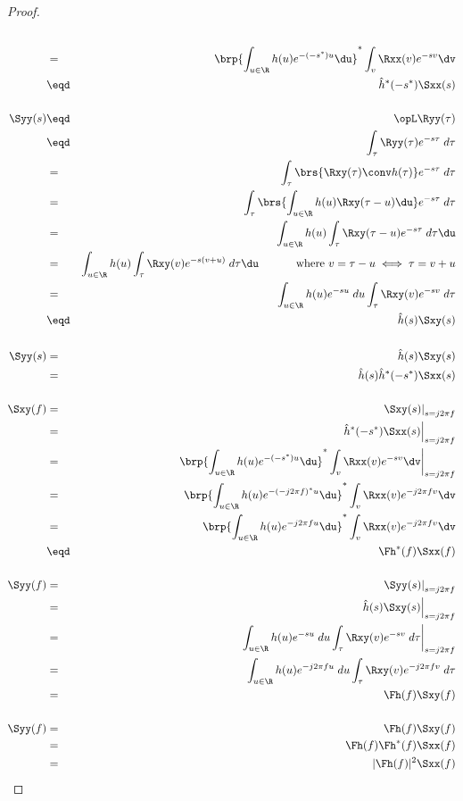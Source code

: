 \begin{proof}
\begin{eqnarray*}
   \\&=&    \brp{\int_{u\in\R}h(u) e^{-(-s^\ast)u} \du }^\ast
            \int_v \Rxx(v)e^{-sv} \dv
   \\&\eqd& \hat{h}^\ast(-s^\ast) \Sxx(s)
\\
\\
   \Syy(s)
     &\eqd& \opL \Ryy(\tau)
   \\&\eqd& \int_\tau \Ryy(\tau) e^{-s\tau} \; d\tau
   \\&=&    \int_\tau \brs{ \Rxy(\tau) \conv h(\tau) } e^{-s\tau} \; d\tau
   \\&=&    \int_\tau \brs{ \int_{u\in\R}h(u) \Rxy(\tau-u)\du } e^{-s\tau} \; d\tau
   \\&=&    \int_{u\in\R}h(u) \int_\tau \Rxy(\tau-u) e^{-s\tau} \; d\tau\du
   \\&=&    \int_{u\in\R}h(u) \int_\tau \Rxy(v) e^{-s(v+u)} \; d\tau\du
            \hspace{3em}\mbox{ where $v=\tau-u\iff \tau=v+u$}
   \\&=&    \int_{u\in\R}h(u)e^{-su} \;du \int_\tau \Rxy(v) e^{-sv} \; d\tau
   \\&\eqd& \hat{h}(s) \Sxy(s)
\\
\\
   \Syy(s)
     &=& \hat{h}(s) \Sxy(s)
   \\&=& \hat{h}(s) \hat{h}^\ast(-s^\ast) \Sxx(s)
\\
\\
   \Sxy(f)
     &=&    \left.\Sxy(s)\right|_{s=j2\pi f}
   \\&=&    \left. \hat{h}^\ast(-s^\ast) \Sxx(s)\right|_{s=j2\pi f}
   \\&=&    \left.
            \brp{\int_{u\in\R}h(u) e^{-(-s^\ast)u} \du }^\ast
            \int_v \Rxx(v)e^{-sv} \dv
            \right|_{s=j2\pi f}
   \\&=&    \brp{\int_{u\in\R}h(u) e^{-(-j2\pi f)^\ast u} \du }^\ast
            \int_v \Rxx(v)e^{-j2\pi fv} \dv
   \\&=&    \brp{\int_{u\in\R}h(u) e^{-j2\pi f u} \du }^\ast
            \int_v \Rxx(v)e^{-j2\pi fv} \dv
   \\&\eqd& \Fh^\ast(f) \Sxx(f)
\\
\\
   \Syy(f)
     &=&    \left.\Syy(s)\right|_{s=j2\pi f}
   \\&=&    \left. \hat{h}(s) \Sxy(s) \right|_{s=j2\pi f}
   \\&=&    \left. \int_{u\in\R}h(u)e^{-su} \;du \int_\tau \Rxy(v) e^{-sv} \; d\tau\right|_{s=j2\pi f}
   \\&=&    \int_{u\in\R}h(u)e^{-j2\pi fu} \;du \int_\tau \Rxy(v) e^{-j2\pi fv} \; d\tau
   \\&=&    \Fh(f) \Sxy(f)
\\
\\
  \Syy(f)
     &=&    \Fh(f)\Sxy(f)
   \\&=&    \Fh(f) \Fh^\ast(f) \Sxx(f)
   \\&=&    |\Fh(f)|^2 \Sxx(f)
\end{eqnarray*}


\end{proof}

